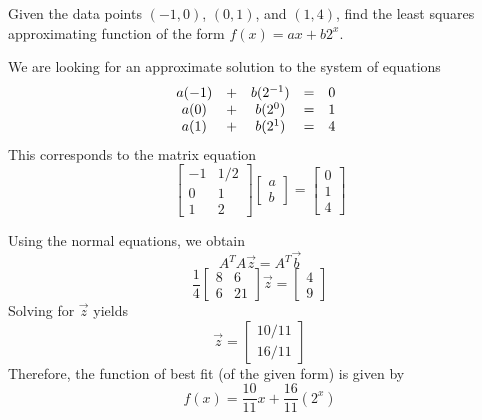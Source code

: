 \documentclass{ximera}
\begin{document}
 \begin{example}\label{ex:leastSq3}
     Given the data points $(-1, 0)$, $(0,1)$, and $(1,4)$, find the least squares approximating function of the form $f(x)=ax+b2^x$.
\begin{explanation}
    We are looking for an approximate solution to the system of equations
    $$\begin{matrix}a(-1)&+&b(2^{-1})&=&0\\a(0)&+&b(2^{0})&=&1\\a(1)&+&b(2^{1})&=&4\end{matrix}\\$$
    This corresponds to the matrix equation
    $$\begin{bmatrix}-1&1/2\\0&1\\1&2\end{bmatrix}\begin{bmatrix}a\\b\end{bmatrix}=\begin{bmatrix}0\\1\\4\end{bmatrix}$$

    Using the normal equations, we obtain
    $$A^TA\vec{z}=A^T\vec{b}$$
    $$\frac{1}{4}\begin{bmatrix}8&6\\6&21\end{bmatrix}\vec{z}=\begin{bmatrix}4\\9\end{bmatrix}$$
Solving for $\vec{z}$ yields
$$\vec{z}=\begin{bmatrix}10/11\\16/11\end{bmatrix}$$
Therefore, the function of best fit (of the given form) is given by $$f(x)=\frac{10}{11}x+\frac{16}{11}(2^x)$$

\begin{onlineOnly}
\begin{center}
\end{center}
\end{onlineOnly}
\end{explanation}
 \end{example}

\end{document}
